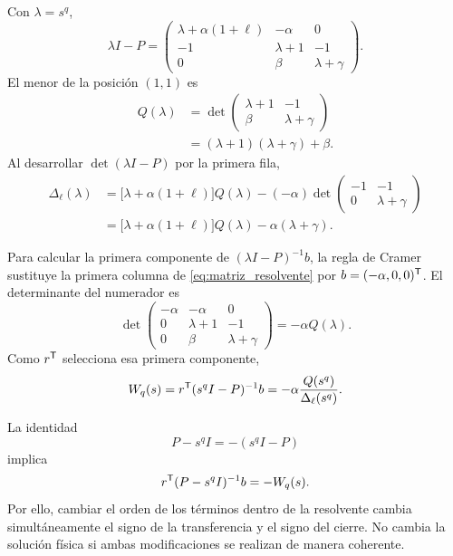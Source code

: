 Con \(\lambda=s^q\),
\begin{equation}
\lambda I-P=
\begin{pmatrix}
\lambda+\alpha(1+\ell)&-\alpha&0\\
-1&\lambda+1&-1\\
0&\beta&\lambda+\gamma
\end{pmatrix}.
\label{eq:matriz_resolvente}
\end{equation}
El menor de la posición \((1,1)\) es
\begin{align}
Q(\lambda)
&=
\det
\begin{pmatrix}
\lambda+1&-1\\
\beta&\lambda+\gamma
\end{pmatrix}\nonumber\\
&=(\lambda+1)(\lambda+\gamma)+\beta.
\label{eq:menor_Q}
\end{align}
Al desarrollar \(\det(\lambda I-P)\) por la primera fila,
\begin{align}
\Delta_\ell(\lambda)
&=\bigl[\lambda+\alpha(1+\ell)\bigr]Q(\lambda)
-(-\alpha)
\det
\begin{pmatrix}
-1&-1\\
0&\lambda+\gamma
\end{pmatrix}\nonumber\\
&=\bigl[\lambda+\alpha(1+\ell)\bigr]Q(\lambda)
-\alpha(\lambda+\gamma).
\label{eq:determinante_transferencia}
\end{align}

Para calcular la primera componente de
\((\lambda I-P)^{-1}b\), la regla de Cramer sustituye la primera columna de
\cref{eq:matriz_resolvente} por
\(b=(-\alpha,0,0)^{\mathsf T}\). El determinante del numerador es
\[
\det
\begin{pmatrix}
-\alpha&-\alpha&0\\
0&\lambda+1&-1\\
0&\beta&\lambda+\gamma
\end{pmatrix}
=-\alpha Q(\lambda).
\]
Como \(r^{\mathsf T}\) selecciona esa primera componente,
\begin{equation}
W_q(s)
=r^{\mathsf T}(s^qI-P)^{-1}b
=-\alpha\frac{Q(s^q)}{\Delta_\ell(s^q)}.
\label{eq:transferencia_cramer}
\end{equation}

La identidad
\[
P-s^qI=-(s^qI-P)
\]
implica
\[
r^{\mathsf T}(P-s^qI)^{-1}b=-W_q(s).
\]
Por ello, cambiar el orden de los términos dentro de la resolvente cambia
simultáneamente el signo de la transferencia y el signo del cierre. No cambia
la solución física si ambas modificaciones se realizan de manera coherente.

